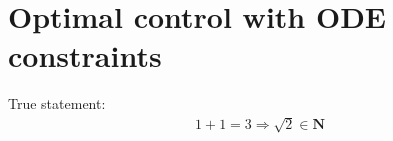 \chapter{Optimal control with ODE constraints}
True statement:
\begin{align*}
1+1 = 3 \Rightarrow \sqrt{2} \in \textbf{N} 
\end{align*}